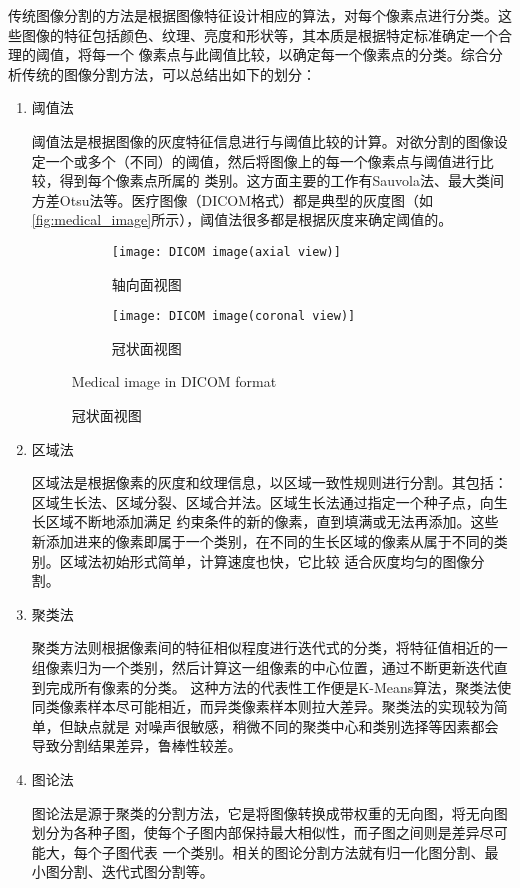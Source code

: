 	传统图像分割的方法是根据图像特征设计相应的算法，对每个像素点进行分类。这些图像的特征包括颜色、纹理、亮度和形状等，其本质是根据特定标准确定一个合理的阈值，将每一个
	像素点与此阈值比较，以确定每一个像素点的分类。综合分析传统的图像分割方法，可以总结出如下的划分：
	\begin{enumerate}
		\item 阈值法
		
		阈值法是根据图像的灰度特征信息进行与阈值比较的计算。对欲分割的图像设定一个或多个（不同）的阈值，然后将图像上的每一个像素点与阈值进行比较，得到每个像素点所属的
		类别。这方面主要的工作有Sauvola法\cite{sauvola2000adaptive}、最大类间方差Otsu法\cite{otsu1979threshold}等。医疗图像（DICOM格式\cite{mustra2008overview}）都是典型的灰度图（如\autoref{fig:medical_image}所示），阈值法很多都是根据灰度来确定阈值的。
		\begin{figure}[!htp]
			\centering
			\begin{subfigure}{0.45\textwidth}
				\centering
				\texttt{[image: DICOM image(axial view)]}
				\caption{轴向面视图}
			\end{subfigure}
			\hfill
			\begin{subfigure}{0.45\textwidth}
				\centering
				\texttt{[image: DICOM image(coronal view)]}
				\caption{冠状面视图}
			\end{subfigure}
				{Medical image in DICOM format}
			\label{fig:medical_image}
		\end{figure}
		
		\item 区域法
		
		区域法是根据像素的灰度和纹理信息，以区域一致性规则进行分割。其包括：区域生长法、区域分裂、区域合并法。区域生长法通过指定一个种子点，向生长区域不断地添加满足
		约束条件的新的像素，直到填满或无法再添加。这些新添加进来的像素即属于一个类别，在不同的生长区域的像素从属于不同的类别。区域法初始形式简单，计算速度也快，它比较
		适合灰度均匀的图像分割。
		
		\item 聚类法
		
		聚类方法则根据像素间的特征相似程度进行迭代式的分类，将特征值相近的一组像素归为一个类别，然后计算这一组像素的中心位置，通过不断更新迭代直到完成所有像素的分类。
		这种方法的代表性工作便是K-Means算法\cite{macqueen1965some}，聚类法使同类像素样本尽可能相近，而异类像素样本则拉大差异。聚类法的实现较为简单，但缺点就是
		对噪声很敏感，稍微不同的聚类中心和类别选择等因素都会导致分割结果差异，鲁棒性较差。
		
		\item 图论法
		
		图论法是源于聚类的分割方法，它是将图像转换成带权重的无向图，将无向图划分为各种子图，使每个子图内部保持最大相似性，而子图之间则是差异尽可能大，每个子图代表
		一个类别。相关的图论分割方法就有归一化图分割、最小图分割、迭代式图分割等。
	\end{enumerate}
	
